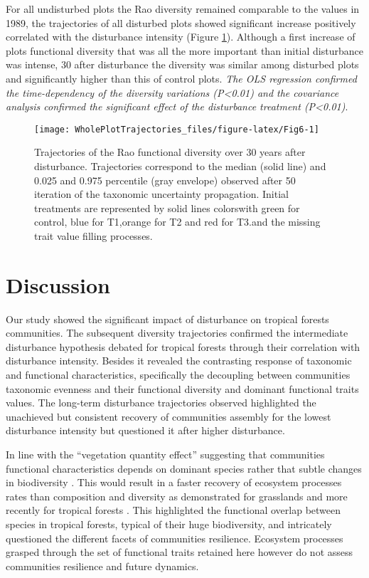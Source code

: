 \documentclass[fleqn,10pt]{ArtEcoFoG} %
\theoremstyle{definition}
\theoremstyle{definition}
\theoremstyle{definition}
\theoremstyle{remark}
\begin{document}
For all undisturbed plots the Rao diversity remained comparable to the
values in 1989, the trajectories of all disturbed plots showed
significant increase positively correlated with the disturbance
intensity (Figure \ref{fig:Fig6}). Although a first increase of plots
functional diversity that was all the more important than initial
disturbance was intense, 30 after disturbance the diversity was similar
among disturbed plots and significantly higher than this of control
plots. \emph{The OLS regression confirmed the time-dependency of the
diversity variations (P\textless{}0.01) and the covariance analysis
confirmed the significant effect of the disturbance treatment
(P\textless{}0.01)}.

\begin{figure}

{\centering \texttt{[image: WholePlotTrajectories\_files/figure-latex/Fig6-1]} 

}

\caption{Trajectories of the Rao functional diversity over 30 years after disturbance. Trajectories correspond to the median (solid line) and 0.025 and 0.975 percentile (gray envelope) observed after 50 iteration of the taxonomic uncertainty propagation. Initial treatments are represented by solid lines colorswith green for control, blue for T1,orange for T2 and red for T3.and the missing trait value filling processes.}\label{fig:Fig6}
\end{figure}

\section{Discussion}\label{discussion}

Our study showed the significant impact of disturbance on tropical
forests communities. The subsequent diversity trajectories confirmed the
intermediate disturbance hypothesis debated for tropical forests through
their correlation with disturbance intensity. Besides it revealed the
contrasting response of taxonomic and functional characteristics,
specifically the decoupling between communities taxonomic evenness and
their functional diversity and dominant functional traits values. The
long-term disturbance trajectories observed highlighted the unachieved
but consistent recovery of communities assembly for the lowest
disturbance intensity but questioned it after higher disturbance.

In line with the ``vegetation quantity effect'' suggesting that
communities functional characteristics depends on dominant species
rather that subtle changes in biodiversity \citep{Grime1998}. This would
result in a faster recovery of ecosystem processes rates than
composition and diversity as demonstrated for grasslands
\citep{Tilman1997, Mouillot2011} and more recently for tropical forests
\citep{Lohbeck2015, Guariguata2001}. This highlighted the functional
overlap between species in tropical forests, typical of their huge
biodiversity, and intricately questioned the different facets of
communities resilience. Ecosystem processes grasped through the set of
functional traits retained here however do not assess communities
resilience and future dynamics.
\end{document}
